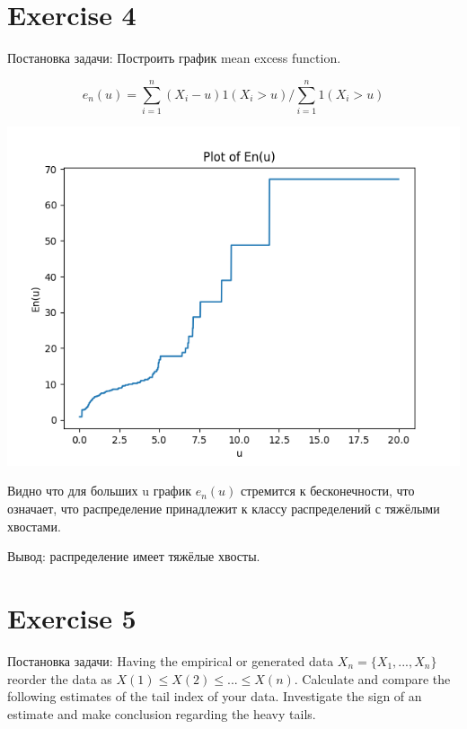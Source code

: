 \documentclass[reprint, amsmath, amssymb, aps,]{revtex4-2}
\begin{document}
\section{Exercise 4}
Постановка задачи:
Построить график mean excess function.

\begin{equation} \label{Ex 4}
e_{n}(u)= \sum_{i=1}^n (X_{i}-u)1(X_{i}>u)/ \sum_{i=1}^n 1(X_{i}>u)
\end{equation}


\begin{center}
\centering 
\includegraphics[scale=0.6]{Exercise4.png}
\end{center}

Видно что для больших u график $e_{n}(u)$ стремится к бесконечности, что означает, что распределение принадлежит к классу распределений с тяжёлыми хвостами.

Вывод: распределение имеет тяжёлые хвосты.

\section{Exercise 5}
Постановка задачи:
Having the empirical or generated data $X_{n} = \lbrace X_{1}, ...,X_{n} \rbrace$ reorder the data as $X(1) \leq X(2) \leq ... \leq X(n)$.
Calculate and compare the following estimates of the tail index of your data. Investigate the sign of an estimate and make conclusion regarding the heavy tails.
\end{document}
